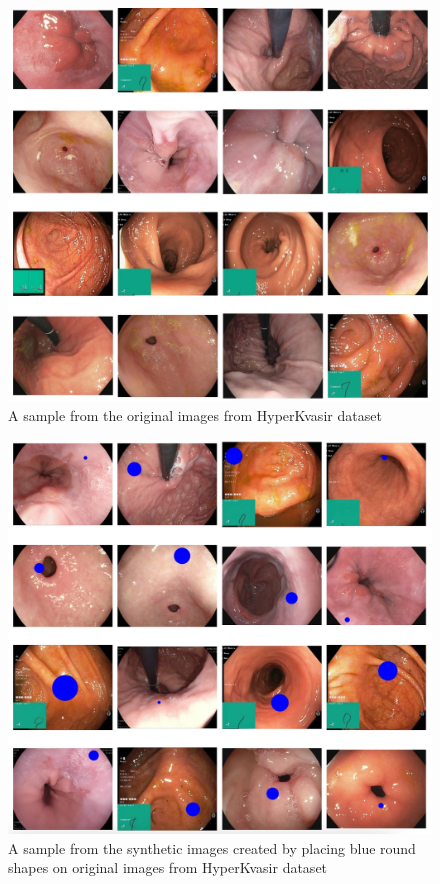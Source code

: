 \documentclass[UKenglish,12pt]{master-style}
\begin{document}
\begin{figure}[ht]
    \centering
    \includegraphics[width=1\textwidth]{Images/Original_Images.jpeg}
    \caption{A sample from the original images from HyperKvasir dataset}
    \label{fig:Original_image}
\end{figure}

\begin{figure}[ht]
    \centering
    \includegraphics[width=1\textwidth]{Images/Synthetic_images.jpeg}
    \caption{A sample from the synthetic images created by placing blue round shapes on original images from HyperKvasir dataset}
    \label{fig:Synthetic_image}
\end{figure}
\end{document}
